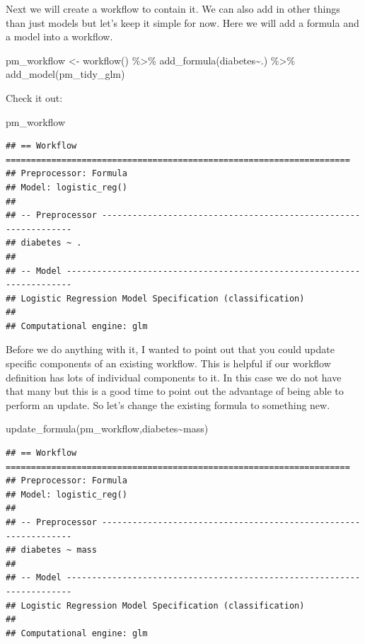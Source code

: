 \documentclass[
]{article}
\newenvironment{Shaded}{\begin{snugshade}}{\end{snugshade}}
\newcommand{\FunctionTok}[1]{\textcolor[rgb]{0.00,0.00,0.00}{#1}}
\newcommand{\NormalTok}[1]{#1}
\newcommand{\OtherTok}[1]{\textcolor[rgb]{0.56,0.35,0.01}{#1}}
\newcommand{\SpecialCharTok}[1]{\textcolor[rgb]{0.00,0.00,0.00}{#1}}
\begin{document}
Next we will create a workflow to contain it. We can also add in other
things than just models but let's keep it simple for now. Here we will
add a formula and a model into a workflow.

\begin{Shaded}
\begin{Highlighting}[]
\NormalTok{pm\_workflow }\OtherTok{\textless{}{-}} \FunctionTok{workflow}\NormalTok{() }\SpecialCharTok{\%\textgreater{}\%}
  \FunctionTok{add\_formula}\NormalTok{(diabetes}\SpecialCharTok{\textasciitilde{}}\NormalTok{.) }\SpecialCharTok{\%\textgreater{}\%} 
  \FunctionTok{add\_model}\NormalTok{(pm\_tidy\_glm)}
\end{Highlighting}
\end{Shaded}

Check it out:

\begin{Shaded}
\begin{Highlighting}[]
\NormalTok{pm\_workflow}
\end{Highlighting}
\end{Shaded}

\begin{verbatim}
## == Workflow ====================================================================
## Preprocessor: Formula
## Model: logistic_reg()
## 
## -- Preprocessor ----------------------------------------------------------------
## diabetes ~ .
## 
## -- Model -----------------------------------------------------------------------
## Logistic Regression Model Specification (classification)
## 
## Computational engine: glm
\end{verbatim}

Before we do anything with it, I wanted to point out that you could
update specific components of an existing workflow. This is helpful if
our workflow definition has lots of individual components to it. In this
case we do not have that many but this is a good time to point out the
advantage of being able to perform an update. So let's change the
existing formula to something new.

\begin{Shaded}
\begin{Highlighting}[]
\FunctionTok{update\_formula}\NormalTok{(pm\_workflow,diabetes}\SpecialCharTok{\textasciitilde{}}\NormalTok{mass)}
\end{Highlighting}
\end{Shaded}

\begin{verbatim}
## == Workflow ====================================================================
## Preprocessor: Formula
## Model: logistic_reg()
## 
## -- Preprocessor ----------------------------------------------------------------
## diabetes ~ mass
## 
## -- Model -----------------------------------------------------------------------
## Logistic Regression Model Specification (classification)
## 
## Computational engine: glm
\end{verbatim}
\end{document}
